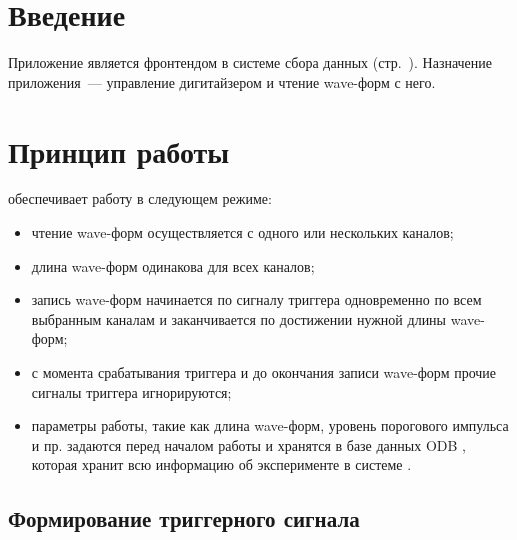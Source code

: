 

%


\section{Введение}

Приложение \FE{} является фронтендом \cite{MidasWikiFrontend} в системе сбора данных \MIDAS{} (стр.~\pageref{sec-midas-frontend}). Назначение приложения~--- управление дигитайзером \DEVICE{} и чтение wave-форм с него.

\section{Принцип работы}
\label{sec_basic}

\FE{} обеспечивает работу \DEVICE{} в следующем режиме:

\begin{itemize}
\item чтение wave-форм осуществляется с одного или нескольких каналов;
\item длина wave-форм одинакова для всех каналов;
\item запись wave-форм начинается по сигналу триггера одновременно по всем выбранным каналам и заканчивается по достижении нужной длины wave-форм;
\item с момента срабатывания триггера и до окончания записи wave-форм прочие сигналы триггера игнорируются;
\item параметры работы, такие как длина wave-форм, уровень порогового импульса и пр. задаются перед началом работы и хранятся в базе данных ODB \cite{MidasWikiODB}, которая хранит всю информацию об эксперименте в системе \MIDAS{}.
\end{itemize}

\subsection{Формирование триггерного сигнала}
\label{sec-v1720-trigger}

